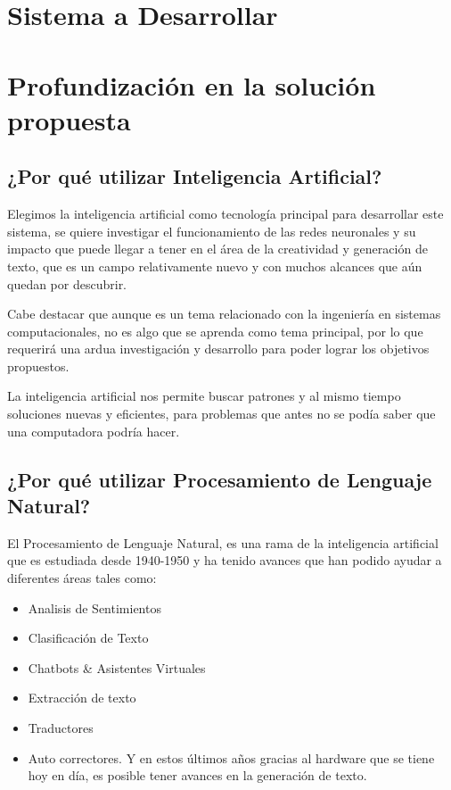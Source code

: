 \documentclass[12pt, a4paper, titlepage]{report}
\begin{document}
	   	\section{Sistema a Desarrollar} %
	   	\section{Profundización en la solución propuesta} %
	   	\subsection{¿Por qué utilizar Inteligencia Artificial?}
	   	Elegimos la inteligencia artificial como tecnología principal para desarrollar este sistema, se quiere investigar el funcionamiento de las redes neuronales y su impacto que puede llegar a tener en el área de la creatividad y generación de texto, que es un campo relativamente nuevo y con muchos alcances que aún quedan por descubrir.
	   	
	   	Cabe destacar que aunque es un tema relacionado con la ingeniería en sistemas computacionales, no es algo que se aprenda como tema principal, por lo que requerirá una ardua investigación y desarrollo para poder lograr los objetivos propuestos.
	   	
	   	La inteligencia artificial nos permite buscar patrones y al mismo tiempo soluciones nuevas y eficientes, para problemas que antes no se podía saber que una computadora podría hacer.
	   	\subsection{¿Por qué utilizar Procesamiento de Lenguaje Natural?}
	   	El Procesamiento de Lenguaje Natural, es una rama de la inteligencia artificial que es estudiada desde 1940-1950\cite{HistoriaNPL} y ha tenido avances que han podido ayudar a diferentes áreas tales como:
	   	\begin{itemize}
	   		\item Analisis de Sentimientos
	   		\item Clasificación de Texto
	   		\item Chatbots \& Asistentes Virtuales
	   		\item Extracción de texto
	   		\item Traductores
	   		\item Auto correctores.
	   		Y en estos últimos años gracias al hardware que se tiene hoy en día, es posible tener avances en la generación de texto.
	   	\end{itemize}
\end{document}

